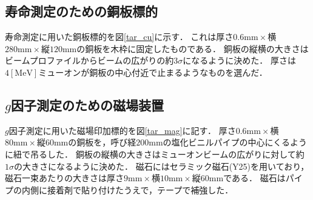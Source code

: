 



%

\subsection{寿命測定のための銅板標的}
寿命測定に用いた銅板標的を図\ref{tar_cu}に示す．
これは厚さ$0.6\mathrm{mm}\times$横$280\mathrm{mm}\times$縦$120\mathrm{mm}$の銅板を木枠に固定したものである．
銅板の縦横の大きさはビームプロファイルからビームの広がりの約$3\sigma$になるように決めた．
厚さは$4[\mathrm{MeV}]$ミューオンが銅板の中心付近で止まるようなものを選んだ．
\subsection{$g$因子測定のための磁場装置}
$g$因子測定に用いた磁場印加標的を図\ref{tar_mag}に記す．
厚さ$0.6\mathrm{mm}\times$横$80\mathrm{mm}\times$縦$60\mathrm{mm}$の銅板を，呼び経$200\mathrm{mm}$の塩化ビニルパイプの中心にくるように紐で吊るした．
銅板の縦横の大きさはミューオンビームの広がりに対して約$1\sigma$の大きさになるように決めた．
磁石にはセラミック磁石(Y25)を用いており，磁石一束あたりの大きさは厚さ$9\mathrm{mm}\times$横$10\mathrm{mm}\times$縦$60\mathrm{mm}$である．
磁石はパイプの内側に接着剤で貼り付けたうえで，テープで補強した．

